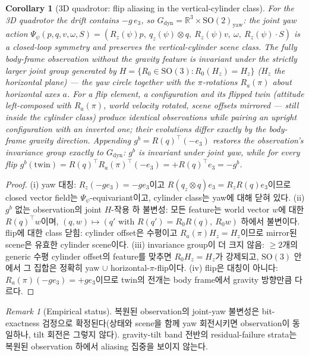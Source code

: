\documentclass[11pt]{article}
\theoremstyle{plain}
\newtheorem{corollary}[theorem]{Corollary}
\theoremstyle{definition}
\theoremstyle{remark}
\newtheorem{remark}[theorem]{Remark}
\newcommand{\R}{\mathbb{R}}
\newcommand{\SO}{\mathrm{SO}}
\begin{document}
\begin{corollary}[3D quadrotor: flip aliasing in the vertical-cylinder class]\label{cor:obs-3d}
For the 3D quadrotor the drift contains $-g\,e_3$, so
$G_{\mathrm{dyn}}=\R^3\times\SO(2)_{\mathrm{yaw}}$: the joint yaw action
$\Psi_\psi(p,q,v,\omega,S)=(R_z(\psi)p,\ q_z(\psi)\otimes q,\ R_z(\psi)v,\ \omega,\
R_z(\psi)\cdot S)$ is a closed-loop symmetry and preserves the vertical-cylinder scene class.
The fully body-frame observation without the gravity feature is invariant under the strictly
larger joint group generated by $H=\{R_0\in\SO(3): R_0(H_z)=H_z\}$ ($H_z$ the horizontal
plane) --- the yaw circle together with the $\pi$-rotations $R_a(\pi)$ about horizontal axes
$a$. For a flip element, a configuration and its flipped twin (attitude left-composed with
$R_a(\pi)$, world velocity rotated, scene offsets mirrored --- still inside the cylinder class)
produce identical observations while pairing an upright configuration with an inverted one;
their evolutions differ exactly by the body-frame gravity direction. Appending
$g^b=R(q)^\top(-e_3)$ restores the observation's invariance group exactly to $G_{\mathrm{dyn}}$:
$g^b$ is invariant under joint yaw, while for every flip
$g^b(\text{twin})=R(q)^\top R_a(\pi)^\top(-e_3)=+R(q)^\top e_3=-g^b$.
\end{corollary}
\begin{proof}
(i) yaw 대칭: $R_z(-ge_3)=-ge_3$이고 $R(q_z\otimes q)e_3=R_zR(q)e_3$이므로 closed vector field는
$\Psi_\psi$-equivariant이고, cylinder class는 yaw에 대해 닫혀 있다.
(ii) $g^b$ 없는 observation의 joint $H$-작용 하 불변성: 모든 feature는 world vector $w$에 대한
$R(q)^\top w$이며, $(q,w)\mapsto(q'\text{ with }R(q')=R_0R(q),\ R_0w)$ 하에서 불변이다. flip에 대한
class 닫힘: cylinder offset은 수평이고 $R_a(\pi)H_z=H_z$이므로 mirror된 scene은 유효한 cylinder
scene이다.
(iii) invariance group이 더 크지 않음: $\ge2$개의 generic 수평 cylinder offset의 feature를 맞추면
$R_0H_z=H_z$가 강제되고, $\SO(3)$ 안에서 그 집합은 정확히 yaw $\cup$ horizontal-$\pi$-flip이다.
(iv) flip은 대칭이 아니다: $R_a(\pi)(-ge_3)=+ge_3$이므로 twin의 전개는 body frame에서 gravity
방향만큼 다르다.
\end{proof}

\begin{remark}[Empirical status]\label{rem:obs-3d-empirical}
복원된 observation의 joint-yaw 불변성은 bit-exactness 검정으로 확정된다(상태와 scene을 함께 yaw
회전시키면 observation이 동일하나, tilt 회전은 그렇지 않다). gravity-tilt band 전반의
residual-failure strata는 복원된 observation 하에서 aliasing 집중을 보이지 않는다.
\end{remark}
\end{document}
